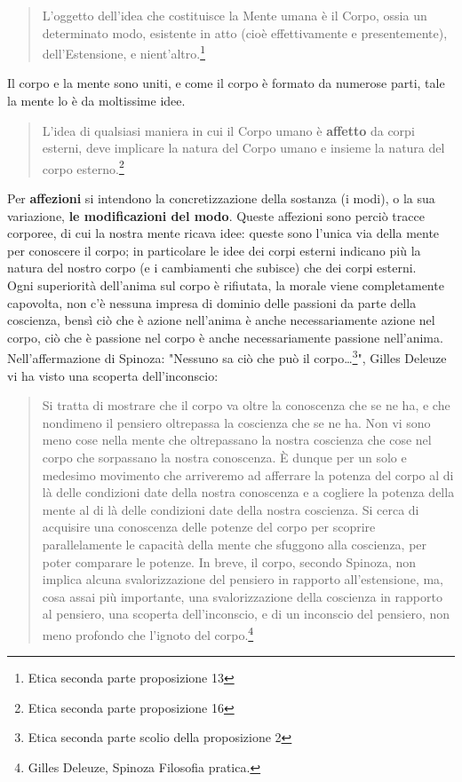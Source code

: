 \begin{quotation}
	\small L’oggetto dell’idea che costituisce la Mente umana è il Corpo, ossia un determinato modo, esistente in atto (cioè effettivamente e presentemente), dell’Estensione, e nient’altro.\footnote{Etica seconda parte proposizione 13}
\end{quotation}

Il corpo e la mente sono uniti, e come il corpo è formato da numerose parti, tale la mente lo è da moltissime idee.

\begin{quotation}
	\small L’idea di qualsiasi maniera in cui il Corpo umano è \textbf{affetto} da corpi esterni, deve implicare la natura del Corpo umano e insieme la natura del corpo esterno.\footnote{Etica seconda parte proposizione 16}
\end{quotation}

Per \textbf{affezioni} si intendono la concretizzazione della sostanza (i modi), o la sua variazione, \textbf{le modificazioni del modo}. Queste affezioni sono perciò tracce corporee, di cui la nostra mente ricava idee: queste sono l'unica via della mente per conoscere il corpo; in particolare le idee dei corpi esterni indicano più la natura del nostro corpo (e i cambiamenti che subisce) che dei corpi esterni.\\
Ogni superiorità dell'anima sul corpo è rifiutata, la morale viene completamente capovolta, non c'è nessuna impresa di dominio delle passioni da parte della coscienza, bensì ciò che è azione nell’anima è anche necessariamente azione nel corpo, ciò che è passione nel corpo è anche necessariamente passione nell’anima. Nell'affermazione di Spinoza: "Nessuno sa ciò che può il corpo…\footnote{Etica seconda parte scolio della proposizione 2}", Gilles Deleuze vi ha visto una scoperta dell'inconscio:

\begin{quotation}
	\small Si tratta di mostrare che il corpo va oltre la conoscenza che se ne ha, e che nondimeno il pensiero oltrepassa la coscienza che se ne ha. Non vi sono meno cose nella mente che oltrepassano la nostra coscienza che cose nel corpo che sorpassano la nostra conoscenza. È dunque per un solo e medesimo movimento che arriveremo ad afferrare la potenza del corpo al di là delle condizioni date della nostra conoscenza e a cogliere la potenza della mente al di là delle condizioni date della nostra coscienza. Si cerca di acquisire una conoscenza delle potenze del corpo per scoprire parallelamente le capacità della mente che sfuggono alla coscienza, per poter comparare le potenze. In breve, il corpo, secondo Spinoza, non implica alcuna svalorizzazione del pensiero in rapporto all’estensione, ma, cosa assai più importante, una svalorizzazione della coscienza in rapporto al pensiero, una scoperta dell’inconscio, e di un inconscio del pensiero, non meno profondo che l’ignoto del corpo.\footnote{Gilles Deleuze, Spinoza Filosofia pratica.}
\end{quotation}

